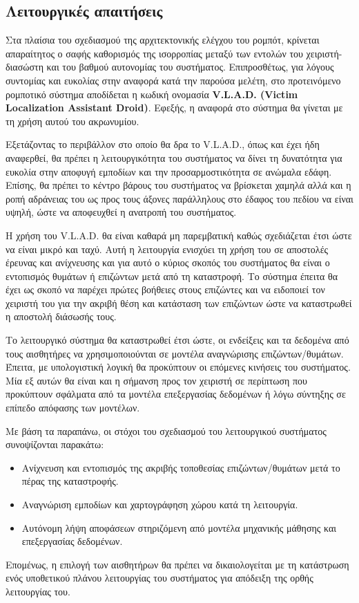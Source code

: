 \subsection{Λειτουργικές απαιτήσεις}
Στα πλαίσια του σχεδιασμού της αρχιτεκτονικής ελέγχου του ρομπότ, κρίνεται απαραίτητος ο σαφής καθορισμός της ισορροπίας μεταξύ των εντολών του χειριστή-διασώστη και του βαθμού αυτονομίας του συστήματος. Επιπροσθέτως, για λόγους συντομίας και ευκολίας στην αναφορά κατά την παρούσα μελέτη, στο προτεινόμενο ρομποτικό σύστημα αποδίδεται η κωδική ονομασία \textbf{V.L.A.D. (Victim Localization Assistant Droid)}. Εφεξής, η αναφορά στο σύστημα θα γίνεται με τη χρήση αυτού του ακρωνυμίου.
\par Εξετάζοντας το περιβάλλον στο οποίο θα δρα το V.L.A.D., όπως και έχει ήδη αναφερθεί, θα πρέπει η λειτουργικότητα του συστήματος να δίνει τη δυνατότητα για ευκολία στην αποφυγή εμποδίων και την προσαρμοστικότητα σε ανώμαλα εδάφη. Επίσης, θα πρέπει το κέντρο βάρους του συστήματος να βρίσκεται χαμηλά αλλά και η ροπή αδράνειας του ως προς τους άξονες παράλληλους στο έδαφος του πεδίου να είναι υψηλή, ώστε να αποφευχθεί η ανατροπή του συστήματος.
\par Η χρήση του V.L.A.D. θα είναι καθαρά μη παρεμβατική καθώς σχεδιάζεται έτσι ώστε να είναι μικρό και ταχύ. Αυτή η λειτουργία ενισχύει τη χρήση του σε αποστολές έρευνας και ανίχνευσης και για αυτό ο κύριος σκοπός του συστήματος θα είναι ο εντοπισμός θυμάτων ή επιζώντων μετά από τη καταστροφή. Το σύστημα έπειτα θα έχει ως σκοπό να παρέχει πρώτες βοήθειες στους επιζώντες και να ειδοποιεί τον χειριστή του για την ακριβή θέση και κατάσταση των επιζώντων ώστε να καταστρωθεί η αποστολή διάσωσής τους.
\par Το λειτουργικό σύστημα θα καταστρωθεί έτσι ώστε, οι ενδείξεις και τα δεδομένα από τους αισθητήρες να χρησιμοποιούνται σε μοντέλα αναγνώρισης επιζώντων/θυμάτων. Έπειτα, με υπολογιστική λογική θα προκύπτουν οι επόμενες κινήσεις του συστήματος. Μία εξ αυτών θα είναι και η σήμανση προς τον χειριστή σε περίπτωση που προκύπτουν σφάλματα από τα μοντέλα επεξεργασίας δεδομένων ή λόγω σύντηξης σε επίπεδο απόφασης των μοντέλων.
\par Με βάση τα παραπάνω, οι στόχοι του σχεδιασμού του λειτουργικού συστήματος συνοψίζονται παρακάτω:
\begin{itemize}
    \item Ανίχνευση και εντοπισμός της ακριβής τοποθεσίας επιζώντων/θυμάτων μετά το πέρας της καταστροφής.
    \item Αναγνώριση εμποδίων και χαρτογράφηση χώρου κατά τη λειτουργία.
    \item Αυτόνομη λήψη αποφάσεων στηριζόμενη από μοντέλα μηχανικής μάθησης και επεξεργασίας δεδομένων.
\end{itemize}
Επομένως, η επιλογή των αισθητήρων θα πρέπει να δικαιολογείται με τη κατάστρωση ενός υποθετικού πλάνου λειτουργίας του συστήματος για απόδειξη της ορθής λειτουργίας του.

